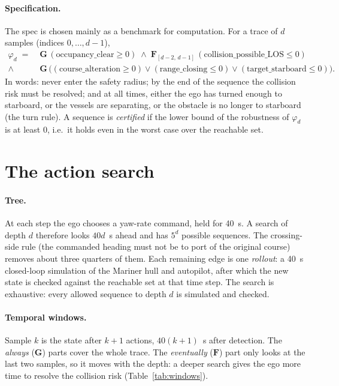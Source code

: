 \documentclass[11pt,a4paper]{article}
\begin{document}
\paragraph{Specification.} The spec is chosen mainly as a benchmark for computation. For a trace of $d$ samples (indices $0,\dots,d-1$),
\begin{align*}
  \varphi_d \;=\;& \mathbf{G}\,(\mathrm{occupancy\_clear} \ge 0)
  \;\wedge\; \mathbf{F}_{[d-2,\,d-1]}\,(\mathrm{collision\_possible\_LOS} \le 0)\\
  \wedge\;& \mathbf{G}\,\big((\mathrm{course\_alteration} \ge 0) \vee
            (\mathrm{range\_closing} \le 0) \vee
            (\mathrm{target\_starboard} \le 0)\big).
\end{align*}
In words: never enter the safety radius; by the end of the sequence the
collision risk must be resolved; and at all times, either the ego has turned
enough to starboard, or the vessels are separating, or the obstacle is no
longer to starboard (the turn rule). A sequence is \emph{certified} if the
lower bound of the robustness of $\varphi_d$ is at least $0$, i.e.\ it holds
even in the worst case over the reachable set.

\section{The action search}

\paragraph{Tree.} At each step the ego chooses a yaw-rate command, held for 40~s. A search of depth
$d$ therefore looks $40d$~s ahead and has $5^d$ possible sequences. The
crossing-side rule (the commanded heading must not be to port of the original
course) removes about three quarters of them. Each remaining edge is one
\emph{rollout}: a 40~s closed-loop simulation of the Mariner hull and
autopilot, after which the new state is checked against the reachable set at
that time step. The search is exhaustive: every allowed sequence to depth $d$
is simulated and checked.

\paragraph{Temporal windows.} Sample $k$ is the state after $k+1$ actions,
$40(k+1)$~s after detection. The \emph{always} ($\mathbf{G}$) parts cover the
whole trace. The \emph{eventually} ($\mathbf{F}$) part only looks at the last
two samples, so it moves with the depth: a deeper search gives the ego more
time to resolve the collision risk (Table~\ref{tab:windows}).
\end{document}
